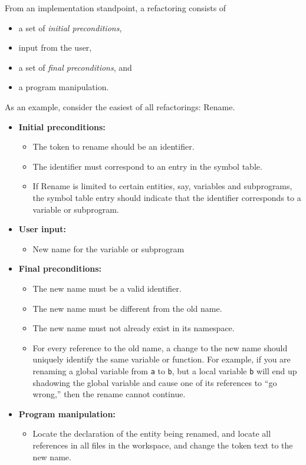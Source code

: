 
From an implementation standpoint, a refactoring consists of
\begin{itemize}
\item a set of \textit{initial preconditions},
\item input from the user,
\item a set of \textit{final preconditions}, and
\item a program manipulation.
\end{itemize}

As an example, consider the easiest of all refactorings: Rename.
\begin{itemize}
\item \textbf{Initial preconditions:}
    \begin{itemize}
    \item The token to rename should be an identifier.
    \item The identifier must correspond to an entry in the symbol table.
    \item If Rename is limited to certain entities, say, variables and subprograms,
          the symbol table entry should indicate that the identifier corresponds
          to a variable or subprogram.
    \end{itemize}
\item \textbf{User input:}
    \begin{itemize}
    \item New name for the variable or subprogram
    \end{itemize}
\item \textbf{Final preconditions:}
    \begin{itemize}
    \item The new name must be a valid identifier.
    \item The new name must be different from the old name.
    \item The new name must not already exist in its namespace.
    \item For every reference to the old name, a change to the new name should uniquely
          identify the same variable or function.  For example, if you are renaming a
          global variable from \texttt{a} to \texttt{b}, but a local variable \texttt{b}
          will end up shadowing the global variable and cause one of its references to
          ``go wrong,'' then the rename cannot continue.
    \end{itemize}
\item \textbf{Program manipulation:}
    \begin{itemize}
    \item Locate the declaration of the entity being renamed, and locate all
          references in all files in the workspace, and change the token text
          to the new name.
    \end{itemize}
\end{itemize}

